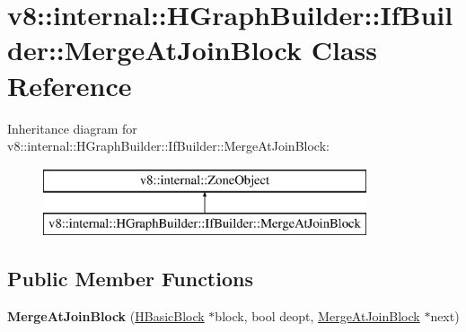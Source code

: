 \hypertarget{classv8_1_1internal_1_1_h_graph_builder_1_1_if_builder_1_1_merge_at_join_block}{}\section{v8\+:\+:internal\+:\+:H\+Graph\+Builder\+:\+:If\+Builder\+:\+:Merge\+At\+Join\+Block Class Reference}
\label{classv8_1_1internal_1_1_h_graph_builder_1_1_if_builder_1_1_merge_at_join_block}
Inheritance diagram for v8\+:\+:internal\+:\+:H\+Graph\+Builder\+:\+:If\+Builder\+:\+:Merge\+At\+Join\+Block\+:\begin{figure}[H]
\begin{center}
\leavevmode
\includegraphics[height=2.000000cm]{classv8_1_1internal_1_1_h_graph_builder_1_1_if_builder_1_1_merge_at_join_block}
\end{center}
\end{figure}
\subsection*{Public Member Functions}
\begin{DoxyCompactItemize}
\item 
{\bfseries Merge\+At\+Join\+Block} (\hyperlink{classv8_1_1internal_1_1_h_basic_block}{H\+Basic\+Block} $\ast$block, bool deopt, \hyperlink{classv8_1_1internal_1_1_h_graph_builder_1_1_if_builder_1_1_merge_at_join_block}{Merge\+At\+Join\+Block} $\ast$next)\hypertarget{classv8_1_1internal_1_1_h_graph_builder_1_1_if_builder_1_1_merge_at_join_block_a1184964bcbb0c2c4c9677818d2d14c87}{}\label{classv8_1_1internal_1_1_h_graph_builder_1_1_if_builder_1_1_merge_at_join_block_a1184964bcbb0c2c4c9677818d2d14c87}

\end{DoxyCompactItemize}

